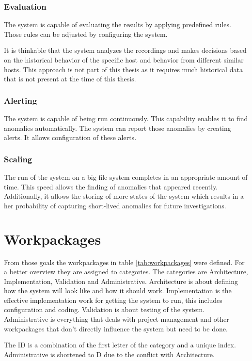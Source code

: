 \documentclass[
	a4paper,					%
	10pt,							%
	twoside,					%
	openright,				%
	notitlepage,			%
	parskip=half,			%
]{scrreprt}					%
\begin{document}
\subsubsection{Evaluation}
The system is capable of evaluating the results by applying predefined rules. Those rules can be adjusted by configuring the system.

It is thinkable that the system analyzes the recordings and makes decisions based on the historical behavior of the specific host and behavior from different similar hosts. This approach is not part of this thesis as it requires much historical data that is not present at the time of this thesis. 

\subsubsection{Alerting}
The system is capable of being run continuously. This capability enables it to find anomalies automatically. The system can report those anomalies by creating alerts. It allows configuration of these alerts.

\subsubsection{Scaling}
The run of the system on a big file system completes in an appropriate amount of time. This speed allows the finding of anomalies that appeared recently. Additionally, it allows the storing of more states of the system which results in a her probability of capturing short-lived anomalies for future investigations. 

\section{Workpackages}

From those goals the workpackages in table \ref{tab:workpackages} were defined. For a better overview they are assigned to categories. The categories are Architecture, Implementation, Validation and Administrative. Architecture is about defining how the system will look like and how it should work. Implementation is the effective implementation work for getting the system to run, this includes configuration and coding. Validation is about testing of the system. Administrative is everything that deals with project management and other workpackages that don't directly influence the system but need to be done.

The ID is a combination of the first letter of the category and a unique index. Administrative is shortened to D due to the conflict with Architecture.
\end{document}

